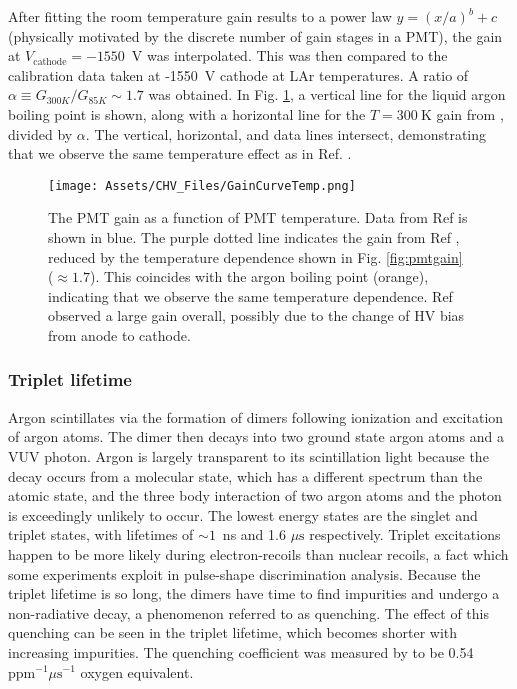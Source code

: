 After fitting the room temperature gain results to a power law $y = (x/a)^b + c$ (physically motivated by the discrete number of gain stages in a PMT), the gain at $V_\mathrm{cathode} = -1550$~V  was interpolated. 
This was then compared to the calibration data taken at -1550~V cathode at LAr temperatures. 
A ratio of $\alpha \equiv G_{300K}/G_{85K}  \sim 1.7$ was obtained. 
In Fig. \ref{fig:pmttemp}, a vertical line for the liquid argon boiling point is shown, along with a horizontal line for the $T=300~\mathrm{K}$ gain from \cite{nikkel_demonstration_2007}, divided by $\alpha$.
The vertical, horizontal, and data lines intersect, demonstrating that we observe the same temperature effect as in Ref. \cite{nikkel_demonstration_2007}.

\begin{figure}
\texttt{[image: Assets/CHV\_Files/GainCurveTemp.png]}
\label{fig:pmttemp}
\caption[The PMT gain as a function of PMT temperature.]%
{The PMT gain as a function of PMT temperature. 
Data from Ref \cite{nikkel_demonstration_2007} is shown in blue.
The purple dotted line indicates the gain from Ref \cite{nikkel_demonstration_2007}, reduced by the temperature dependence shown in Fig. \ref{fig:pmtgain} ($\approx 1.7$).
This coincides with the argon boiling point (orange), indicating that we observe the same temperature dependence.
Ref \cite{nikkel_demonstration_2007} observed a large gain overall, possibly due to the change of HV bias from anode to cathode.
}
\end{figure}

\subsubsection{Triplet lifetime}
Argon scintillates via the formation of dimers following ionization and excitation of argon atoms.
The dimer then decays into two ground state argon atoms and a VUV photon.
Argon is largely transparent to its scintillation light because the decay occurs from a molecular state, which has a different spectrum than the atomic state, and the three body interaction of two argon atoms and the photon is exceedingly unlikely to occur.
The lowest energy states are the singlet and triplet states, with lifetimes of $\sim 1$~ns and 1.6 $\mu\mathrm{s}$ respectively.
Triplet excitations happen to be more likely during electron-recoils than nuclear recoils, a fact which some experiments exploit in pulse-shape discrimination analysis. 
Because the triplet lifetime is so long, the dimers have time to find impurities and undergo a non-radiative decay, a phenomenon referred to as quenching. 
The effect of this quenching can be seen in the triplet lifetime, which becomes shorter with increasing impurities.
The quenching coefficient was measured by \cite{acciarri_oxygen_2010} to be 0.54 $\mathrm{ppm^{-1}} \mu\mathrm{s}^{-1}$ oxygen equivalent.

